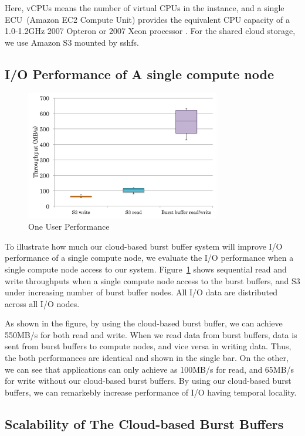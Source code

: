 Here, vCPUs means the number of virtual CPUs in the instance, 
and a single ECU~(Amazon EC2 Compute Unit) provides the equivalent CPU capacity
of a 1.0-1.2GHz 2007 Opteron or 2007 Xeon processor \cite{AMAZON_AWS}.
For the shared cloud storage, we use Amazon S3 mounted by sshfs\cite{sshfs}.

\subsection{I/O Performance of A single compute node}

\begin{figure}
\centering
\includegraphics[width=8.5cm]{img/one_client-2.pdf}
\caption{One User Performance}
\label{evaluation:one user performance}
\end{figure}
To illustrate how much our cloud-based burst buffer system will improve I/O
performance of a single compute node, we evaluate the I/O performance when a
single compute node access to our system.
Figure~\ref{evaluation:one user performance} shows sequential read and write
throughputs when a single compute node access to the burst buffers, and S3
under increasing number of burst buffer nodes. All I/O data are distributed
across all I/O nodes.

As shown in the figure, by using the cloud-based burst buffer, we can 
achieve 550MB/s for both read and write.
When we read data from burst buffers, data is sent from burst buffers to compute
nodes, and vice versa in writing data. Thus, the both performances are identical
and shown in the single bar. On the other, we can see that applications
can only achieve as 100MB/s for read, and 65MB/s for write without our
cloud-based burst buffers. By using our cloud-based burst buffers, 
we can remarkebly increase performance of I/O having temporal
locality.

\subsection{Scalability of The Cloud-based Burst Buffers}

